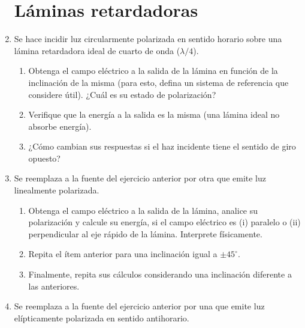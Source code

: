 \documentclass[11pt,spanish]{article}
\begin{document}
\begin{enumerate}
\section*{Láminas retardadoras}


    \item Se hace incidir luz circularmente polarizada en sentido horario sobre
    una lámina retardadora ideal de cuarto de onda ($\lambda/4$).
    
    \begin{enumerate}
        \item Obtenga el campo eléctrico a la salida de la lámina en función de
        la inclinación de la misma (para esto, defina un sistema de referencia
        que considere útil). ¿Cuál es su estado de polarización?
        
        \item Verifique que la energía a la salida es la misma (una lámina ideal
        no absorbe energía).
        
        \item ¿Cómo cambian sus respuestas si el haz incidente tiene el sentido
        de giro opuesto?
    \end{enumerate}
    
    
    \item Se reemplaza a la fuente del ejercicio anterior por otra que emite luz
    linealmente polarizada. 
    
    \begin{enumerate}
        \item Obtenga el campo eléctrico a la salida de la lámina, analice su
        polarización y calcule su energía, si el campo eléctrico es (i) paralelo
        o (ii) perpendicular al eje rápido de la lámina. Interprete físicamente.
        
        \item Repita el ítem anterior para una inclinación igual a $\pm 45^\circ$.
        
        \item Finalmente, repita sus cálculos considerando una inclinación
        diferente a las anteriores.
    \end{enumerate}
    
    
    \item Se reemplaza a la fuente del ejercicio anterior por una que emite luz
    elípticamente polarizada en sentido antihorario.
    

\end{enumerate}
\end{document}
